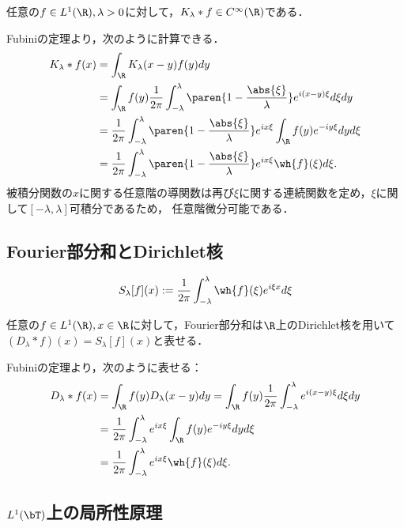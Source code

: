 \documentclass[uplatex,dvipdfmx]{jsreport}
\begin{document}
\begin{proposition}[Fejer核の軟化性]
    任意の$f\in L^1(\R),\lambda>0$に対して，$K_\lambda*f\in C^\infty(\R)$である．
\end{proposition}
\begin{Proof}
    Fubiniの定理より，次のように計算できる．
    \begin{align*}
        K_\lambda*f(x)&=\int_\R K_\lambda(x-y)f(y)dy\\
        &=\int_\R f(y)\frac{1}{2\pi}\int^\lambda_{-\lambda}\paren{1-\frac{\abs{\xi}}{\lambda}}e^{i(x-y)\xi}d\xi dy\\
        &=\frac{1}{2\pi}\int^\lambda_{-\lambda}\paren{1-\frac{\abs{\xi}}{\lambda}}e^{ix\xi}\int_\R f(y)e^{-iy\xi}dyd\xi\\
        &=\frac{1}{2\pi}\int^\lambda_{-\lambda}\paren{1-\frac{\abs{\xi}}{\lambda}}e^{ix\xi}\wh{f}(\xi)d\xi.
    \end{align*}
    被積分関数の$x$に関する任意階の導関数は再び$\xi$に関する連続関数を定め，$\xi$に関して$[-\lambda,\lambda]$可積分であるため，
    任意階微分可能である．
\end{Proof}

\subsection{Fourier部分和とDirichlet核}

\begin{notation}
    \[S_\lambda[f](x):=\frac{1}{2\pi}\int^\lambda_{-\lambda}\wh{f}(\xi)e^{i\xi x}d\xi\]
\end{notation}

\begin{proposition}
    任意の$f\in L^1(\R),x\in\R$に対して，Fourier部分和は$\R$上のDirichlet核を用いて$(D_\lambda*f)(x)=S_\lambda[f](x)$と表せる．
\end{proposition}
\begin{Proof}
    Fubiniの定理より，次のように表せる：
    \begin{align*}
        D_\lambda*f(x)&=\int_\R f(y)D_\lambda(x-y)dy=\int_\R f(y)\frac{1}{2\pi}\int^\lambda_{-\lambda}e^{i(x-y)\xi}d\xi dy\\
        &=\frac{1}{2\pi}\int^\lambda_{-\lambda}e^{ix\xi}\int_\R f(y)e^{-iy\xi}dyd\xi\\
        &=\frac{1}{2\pi}\int^\lambda_{-\lambda}e^{ix\xi}\wh{f}(\xi)d\xi.
    \end{align*}
\end{Proof}

\subsection{$L^1(\bT)$上の局所性原理}
\end{document}
